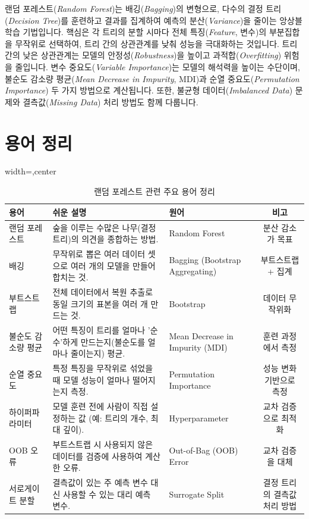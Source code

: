 \documentclass[11pt,a4paper]{book}
\theoremstyle{definition}
\begin{document}
\begin{tcolorbox}[infobox, title={문서 핵심 요약}]
랜덤 포레스트(\emph{Random Forest})는 배깅(\emph{Bagging})의 변형으로, 다수의 결정 트리(\emph{Decision Tree})를 훈련하고 결과를 집계하여 예측의 분산(\emph{Variance})을 줄이는 앙상블 학습 기법입니다.
핵심은 각 트리의 분할 시마다 전체 특징(\emph{Feature}, 변수)의 부분집합을 무작위로 선택하여, 트리 간의 상관관계를 낮춰 성능을 극대화하는 것입니다.
트리 간의 낮은 상관관계는 모델의 안정성(\emph{Robustness})을 높이고 과적합(\emph{Overfitting}) 위험을 줄입니다.
변수 중요도(\emph{Variable Importance})는 모델의 해석력을 높이는 수단이며, 불순도 감소량 평균(\emph{Mean Decrease in Impurity}, MDI)과 순열 중요도(\emph{Permutation Importance}) 두 가지 방법으로 계산됩니다.
또한, 불균형 데이터(\emph{Imbalanced Data}) 문제와 결측값(\emph{Missing Data}) 처리 방법도 함께 다룹니다.
\end{tcolorbox}


\section{용어 정리}

\begin{tcolorbox}[infobox, title={주요 용어 및 직관적 설명}]
\begin{table}[h]
\centering
\begin{adjustbox}{width=\textwidth,center}
\begin{tabular}{lllc}
\toprule
\textbf{용어} & \textbf{쉬운 설명} & \textbf{원어} & \textbf{비고} \\
\midrule
랜덤 포레스트 & 숲을 이루는 수많은 나무(결정 트리)의 의견을 종합하는 방법. & Random Forest & 분산 감소가 목표 \\
배깅 & 무작위로 뽑은 여러 데이터 셋으로 여러 개의 모델을 만들어 합치는 것. & Bagging (Bootstrap Aggregating) & 부트스트랩 + 집계 \\
부트스트랩 & 전체 데이터에서 복원 추출로 동일 크기의 표본을 여러 개 만드는 것. & Bootstrap & 데이터 무작위화 \\
불순도 감소량 평균 & 어떤 특징이 트리를 얼마나 '순수'하게 만드는지(불순도를 얼마나 줄이는지) 평균. & Mean Decrease in Impurity (MDI) & 훈련 과정에서 측정 \\
순열 중요도 & 특정 특징을 무작위로 섞었을 때 모델 성능이 얼마나 떨어지는지 측정. & Permutation Importance & 성능 변화 기반으로 측정 \\
하이퍼파라미터 & 모델 훈련 전에 사람이 직접 설정하는 값 (예: 트리의 개수, 최대 깊이). & Hyperparameter & 교차 검증으로 최적화 \\
OOB 오류 & 부트스트랩 시 사용되지 않은 데이터를 검증에 사용하여 계산한 오류. & Out-of-Bag (OOB) Error & 교차 검증을 대체 \\
서로게이트 분할 & 결측값이 있는 주 예측 변수 대신 사용할 수 있는 대리 예측 변수. & Surrogate Split & 결정 트리의 결측값 처리 방법 \\
\bottomrule
\end{tabular}
\end{adjustbox}
\caption{랜덤 포레스트 관련 주요 용어 정리}
\label{tab:terms}
\end{table}
\end{tcolorbox}
\end{document}
